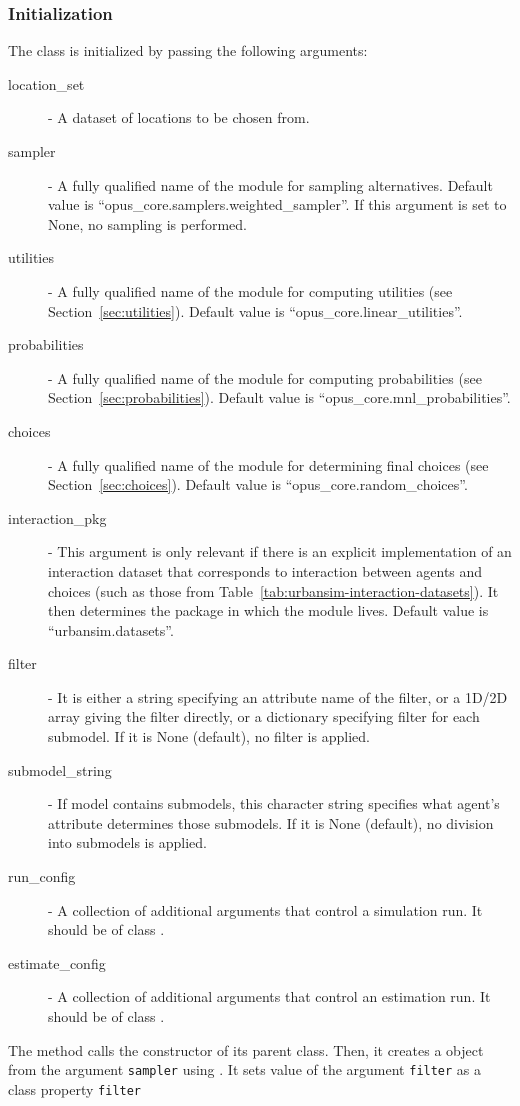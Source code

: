 \subsubsection{Initialization}
%
The class is initialized by passing the following arguments:
\begin{description}
\item[location_set] - A dataset \datasetindex of locations to be chosen from.
\item[sampler] - A fully qualified name of the module for sampling
  alternatives. Default value is ``opus_core.samplers.weighted_sampler''. If
  this argument is set to None, no sampling is performed.
\item[utilities] - A fully qualified name of the module for computing utilities
  (see Section~\ref{sec:utilities}). Default value is
  ``opus_core.linear_utilities''.
\item[probabilities] - A fully qualified name of the module for computing
  probabilities (see Section~\ref{sec:probabilities}). Default value is
  ``opus_core.mnl_probabilities''.
\item[choices] - A fully qualified name of the module for determining
  final choices (see Section~\ref{sec:choices}). Default value is
  ``opus_core.random_choices''.
\item[interaction_pkg] - This argument is only relevant if there is an
  explicit implementation of an interaction dataset that corresponds to
  interaction between agents and choices (such as those from
  Table~\ref{tab:urbansim-interaction-datasets}). It then determines the
  package in which the module lives. Default value is
  ``urbansim.datasets''. \datasetindex
\item[filter] - It is either a string specifying an attribute \attributesindex name of the
  filter, or a 1D/2D array giving the filter directly, or a dictionary
  specifying filter for each submodel. If it is None (default), no filter is
  applied.
\item[submodel_string] - If model \modelsindex contains submodels, this character string
  specifies what agent's attribute determines those submodels. If it is None
  (default), no division into submodels is applied.
\item[run_config] - A collection of additional arguments that control a
  simulation run. It should be of class .
\item[estimate_config] - A collection of additional arguments that control an
  estimation run. It should be of class .
\end{description}
The method calls the constructor of its parent class. Then, it creates a
 object from the argument \verb|sampler| using
. It sets value of the argument \verb|filter| as a class
property \verb|filter|

